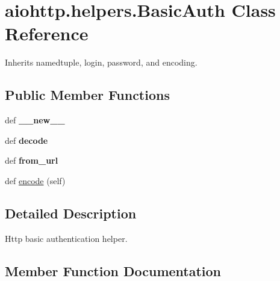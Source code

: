 \hypertarget{classaiohttp_1_1helpers_1_1_basic_auth}{}\section{aiohttp.\+helpers.\+Basic\+Auth Class Reference}
\label{classaiohttp_1_1helpers_1_1_basic_auth}


Inherits namedtuple, login, password, and encoding.

\subsection*{Public Member Functions}
\begin{DoxyCompactItemize}
\item 
\mbox{\label{classaiohttp_1_1helpers_1_1_basic_auth_a5a50c5609347e8835033f8afc6a49d54}} 
def {\bfseries \+\_\+\+\_\+new\+\_\+\+\_\+}
\item 
\mbox{\label{classaiohttp_1_1helpers_1_1_basic_auth_a7e2a128ea1eab44b0b497f9ca0a565f4}} 
def {\bfseries decode}
\item 
\mbox{\label{classaiohttp_1_1helpers_1_1_basic_auth_a274ce338780500272f4554371a20d38d}} 
def {\bfseries from\+\_\+url}
\item 
def \hyperlink{classaiohttp_1_1helpers_1_1_basic_auth_aeaba0e3a6a98ef0d6b19b82453b7fab9}{encode} (self)
\end{DoxyCompactItemize}


\subsection{Detailed Description}
\begin{DoxyVerb}Http basic authentication helper.\end{DoxyVerb}
 

\subsection{Member Function Documentation}
\mbox{\label{classaiohttp_1_1helpers_1_1_basic_auth_aeaba0e3a6a98ef0d6b19b82453b7fab9}} 
